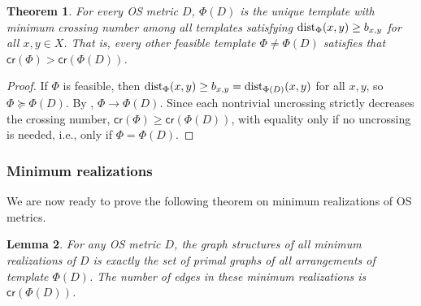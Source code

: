 \documentclass[11pt]{article}
\newtheorem{theorem}{Theorem}
\newtheorem{lemma}[theorem]{Lemma}
\newcommand{\dist}{\textnormal{dist}}
\newcommand{\cro}{{\mathsf{cr}}}
\begin{document}
\begin{theorem}\label{thm:unique-template}
For every OS metric $D$, $\Phi(D)$ is the unique template with minimum crossing number among all templates satisfying $\dist_\Phi(x,y)\ge b_{x,y}$ for all $x,y\in X$.
That is, every other feasible template $\Phi\ne \Phi(D)$ satisfies that $\cro(\Phi)>\cro(\Phi(D))$.
\end{theorem}

\begin{proof}
If $\Phi$ is feasible, then $\dist_\Phi(x,y)\ge b_{x,y}=\dist_{\Phi(D)}(x,y)$ for all $x,y$, so $\Phi\succeq \Phi(D)$.  By , $\Phi\to \Phi(D)$. Since each nontrivial uncrossing strictly decreases the crossing number, $\cro(\Phi)\ge \cro(\Phi(D))$, with equality only if no uncrossing is needed, i.e., only if $\Phi=\Phi(D)$.
\end{proof}

\subsubsection{Minimum realizations}

We are now ready to prove the following theorem on minimum realizations of OS metrics.

\begin{lemma}\label{thm:minimum-realization}
For any OS metric $D$, the graph structures of all minimum realizations of $D$ is exactly the set of primal graphs of all arrangements of template $\Phi(D)$.
The number of edges in these minimum realizations is $\cro(\Phi(D))$.
\end{lemma}
\end{document}
